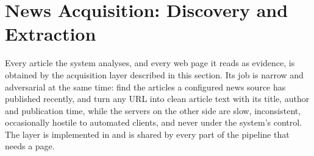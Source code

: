 %

\section{News Acquisition: Discovery and Extraction}
\label{sec:dev-scraping}

Every article the system analyses, and every web page it reads as
evidence, is obtained by the acquisition layer described in this
section. Its job is narrow and adversarial at the same time: find the
articles a configured news source has published recently, and turn any
URL into clean article text with its title, author and publication
time, while the servers on the other side are slow, inconsistent,
occasionally hostile to automated clients, and never under the
system's control. The layer is implemented in
 and is shared by every part of the
pipeline that needs a page.




























